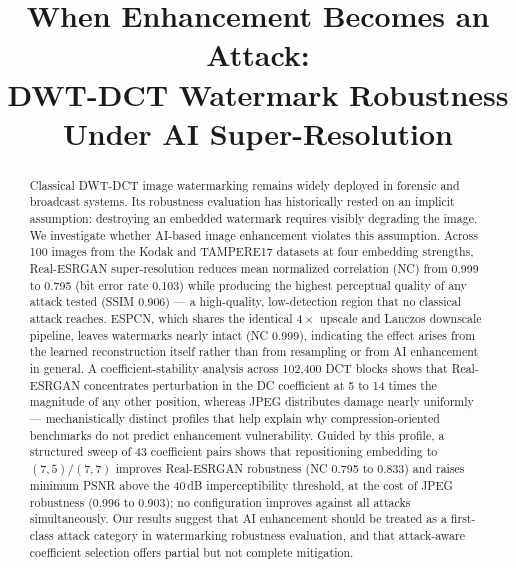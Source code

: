 \documentclass[conference]{IEEEtran}
\begin{document}
\title{When Enhancement Becomes an Attack:\\
DWT-DCT Watermark Robustness Under AI Super-Resolution}

\author{
} %

\maketitle

\begin{abstract}
Classical DWT-DCT image watermarking remains widely deployed in
forensic and broadcast systems. Its robustness evaluation has
historically rested on an implicit assumption: destroying an embedded
watermark requires visibly degrading the image. We investigate whether
AI-based image enhancement violates this assumption. Across 100 images
from the Kodak and TAMPERE17 datasets at four embedding strengths,
Real-ESRGAN super-resolution reduces mean normalized correlation (NC)
from 0.999 to 0.795 (bit error rate 0.103) while producing the highest
perceptual quality of any attack tested (SSIM 0.906) --- a
high-quality, low-detection region that no classical attack reaches.
ESPCN, which shares the identical $4\times$ upscale and Lanczos
downscale pipeline, leaves watermarks nearly intact (NC 0.999),
indicating the effect arises from the learned reconstruction itself
rather than from resampling or from AI enhancement in general. A
coefficient-stability analysis across 102,400 DCT blocks shows that
Real-ESRGAN concentrates perturbation in the DC coefficient at 5 to 14
times the magnitude of any other position, whereas JPEG distributes
damage nearly uniformly --- mechanistically distinct profiles that
help explain why compression-oriented benchmarks do not predict
enhancement vulnerability. Guided by this profile, a structured sweep
of 43 coefficient pairs shows that repositioning embedding to
$(7,5)/(7,7)$ improves Real-ESRGAN robustness (NC 0.795 to 0.833) and
raises minimum PSNR above the 40\,dB imperceptibility threshold, at
the cost of JPEG robustness (0.996 to 0.903); no configuration
improves against all attacks simultaneously. Our results suggest that
AI enhancement should be treated as a first-class attack category in
watermarking robustness evaluation, and that attack-aware coefficient
selection offers partial but not complete mitigation.
\end{abstract}
\end{document}
